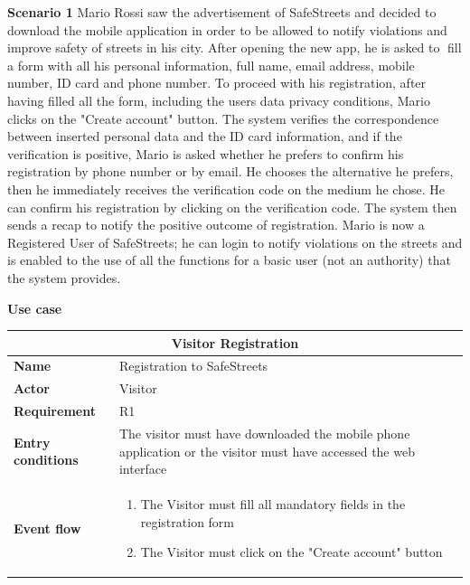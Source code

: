 \begin{description}
    \item \label{scenario1} \textbf{Scenario 1} \newline
        Mario Rossi saw the advertisement of SafeStreets and decided to download the mobile application in order to be allowed to notify violations and improve safety of streets in his city. After
        opening the new app, he is asked to fill a form with all his personal information, full name, email address, mobile number, ID card and phone number. To proceed with his
        registration, after having filled all the form, including the users data privacy conditions, Mario clicks on the "Create account" button. The system verifies the correspondence between inserted personal data and the ID card information,
        and if the verification is positive, Mario is asked whether he prefers to confirm his registration by phone number or by email.
        He chooses the alternative he prefers, then he immediately receives the verification code on the medium he chose.
        He can confirm his registration by clicking on the verification code. The system then sends a recap to notify the positive outcome of registration. Mario is now a Registered
        User of SafeStreets; he can login to notify violations on the streets and is enabled to the use of all the functions for a basic user (not an authority) that the system provides.
    \item \textbf{Use case}
    \begin{center}
        \begin{tabular}{|p{3cm}|p{7cm}|}
            \multicolumn{2}{c}{\textbf{Visitor Registration}} \\
            \hline
            \textbf{Name} & Registration to SafeStreets \\
            \hline
            \textbf{Actor} & Visitor \\
            \hline
            \textbf{Requirement} & R1 \\
            \hline
            \textbf{Entry conditions} & The visitor must have downloaded the mobile phone application or the visitor must have accessed the web interface \\
            \hline
            \textbf{Event flow} &
            \begin{enumerate}
                \item The Visitor must fill all mandatory fields in the registration form
                \item The Visitor must click on the "Create account" button

\end{enumerate}
\end{tabular}
\end{center}
\end{description}
